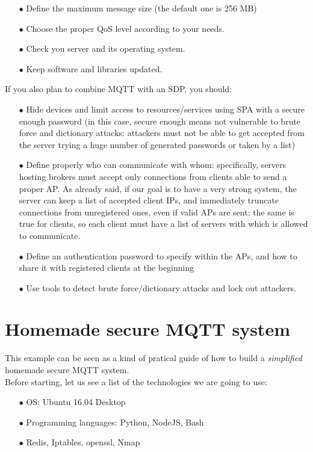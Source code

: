 \documentclass[12pt]{report}
\begin{document}
{\begin{itemize}
There are many tools to automatize this mechanism, called load balancers and most of them are also able to detect unusually high traffic and block it.
\item[$\bullet$] Define the maximum message size (the default one is 256 MB)
\item[$\bullet$] Choose the proper QoS level according to your needs.
\item[$\bullet$] Check you server and its operating system.
\item[$\bullet$] Keep software and libraries updated.\\
\end{itemize}

If you also plan to combine MQTT with an SDP, you should:

\begin{itemize}
\setlength{\itemindent}{+4mm}
\item[$\bullet$] Hide devices and limit access to resources/services using SPA with a secure enough password (in this case, secure enough means not vulnerable to brute force and dictionary attacks: attackers must not be able to get accepted from the server trying a huge number of generated passwords or taken by a list)
\item[$\bullet$] Define properly who can communicate with whom: specifically, servers hosting brokers must accept only connections from clients able to send a proper AP. As already said, if our goal is to have a very strong system, the server can keep a list of accepted client IPs, and immediately truncate connections from unregistered ones, even if valid APs are sent; the same is true for clients, so each client must have a list of servers with which is allowed to communicate.
\item[$\bullet$] Define an authentication password to specify within the APs, and how to share it with registered clients at the beginning
\item[$\bullet$] Use tools to detect brute force/dictionary attacks and lock out attackers.
\end{itemize}


\section{Homemade secure MQTT system}
\label{sec:homemademqtt}
\bigskip
This example can be seen as a kind of pratical guide of how to build a \emph{simplified} homemade secure MQTT system.\\
Before starting, let us see a list of the technologies we are going to use:
\bigskip
\begin{itemize}
\setlength{\itemindent}{+4mm}
\item[$\bullet$] OS: Ubuntu 16.04 Desktop
\item[$\bullet$] Programming languages: Python, NodeJS, Bash
\item[$\bullet$] Redis, Iptables, openssl, Nmap\\
\end{itemize}

}
\end{document}
